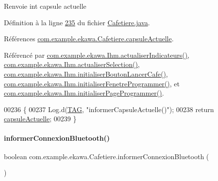 \begin{DoxyReturn}{Renvoie}
int capsule actuelle 
\end{DoxyReturn}


Définition à la ligne \hyperlink{_cafetiere_8java_source_l00235}{235} du fichier \hyperlink{_cafetiere_8java_source}{Cafetiere.\+java}.



Références \hyperlink{_cafetiere_8java_source_l00087}{com.\+example.\+ekawa.\+Cafetiere.\+capsule\+Actuelle}.



Référencé par \hyperlink{_ihm_8java_source_l00855}{com.\+example.\+ekawa.\+Ihm.\+actualiser\+Indicateurs()}, \hyperlink{_ihm_8java_source_l00892}{com.\+example.\+ekawa.\+Ihm.\+actualiser\+Selection()}, \hyperlink{_ihm_8java_source_l00526}{com.\+example.\+ekawa.\+Ihm.\+initialiser\+Bouton\+Lancer\+Cafe()}, \hyperlink{_ihm_8java_source_l00727}{com.\+example.\+ekawa.\+Ihm.\+initialiser\+Fenetre\+Programmer()}, et \hyperlink{_ihm_8java_source_l00668}{com.\+example.\+ekawa.\+Ihm.\+initialiser\+Page\+Programmer()}.


\begin{DoxyCode}
00236     \{
00237         Log.d(\hyperlink{classcom_1_1example_1_1ekawa_1_1_cafetiere_aa0c1fd99a2508b06c462aea17034aa91}{TAG}, \textcolor{stringliteral}{"informerCapsuleActuelle()"});
00238         \textcolor{keywordflow}{return} \hyperlink{classcom_1_1example_1_1ekawa_1_1_cafetiere_ac8fa3d1ad76eccf431ee04b395a557a3}{capsuleActuelle};
00239     \}
\end{DoxyCode}
\mbox{\label{classcom_1_1example_1_1ekawa_1_1_cafetiere_a97d9ca4701a961fe8865ecfa1d5bf64a}} 
\paragraph{\texorpdfstring{informer\+Connexion\+Bluetooth()}{informerConnexionBluetooth()}}
{\footnotesize\ttfamily boolean com.\+example.\+ekawa.\+Cafetiere.\+informer\+Connexion\+Bluetooth (\begin{DoxyParamCaption}{ }\end{DoxyParamCaption})}



